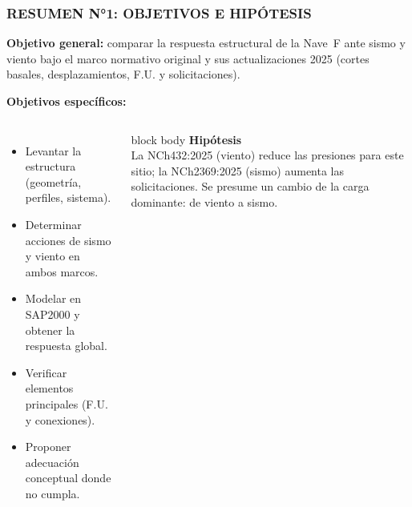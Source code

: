 \documentclass[11.5pt,aspectratio=169,handout]{beamer}
\newcommand{\ctitle}[1]{\frametitle{#1}}
\begin{document}
\begin{frame}
\ctitle{RESUMEN N°1: OBJETIVOS E HIPÓTESIS}
\vspace{-1mm}
{\footnotesize\textbf{Objetivo general:} comparar la respuesta estructural de la Nave~F ante sismo y viento
bajo el marco normativo original y sus actualizaciones 2025 (cortes basales,
desplazamientos, F.U. y solicitaciones).}

\vspace{2mm}
{\footnotesize\textbf{Objetivos específicos:}}\\[1mm]
\begin{columns}[T,totalwidth=\textwidth]
  \begin{itemize}\footnotesize\setlength{\itemsep}{1.5mm}
    \item \alert{Levantar} la estructura (geometría, perfiles,
          sistema).
    \item \alert{Determinar} acciones de sismo y viento en
          ambos marcos.
    \item \alert{Modelar} en SAP2000 y obtener la respuesta
          global.
    \item \alert{Verificar} elementos principales (F.U. y
          conexiones).
    \item \alert{Proponer} adecuación conceptual donde no
          cumpla.
  \end{itemize}
  \vspace{2mm}
  \begin{beamercolorbox}[rounded=true,shadow=true,sep=3mm]{block body}
  {\footnotesize\textbf{Hipótesis}}\\[1mm]
  {\footnotesize La \alert{NCh432:2025} (viento) \alert{reduce} las presiones
  para este sitio; la \alert{NCh2369:2025} (sismo)
  \alert{aumenta} las solicitaciones. Se presume un
  \alert{cambio de la carga dominante}: de viento a
  sismo.}
  \end{beamercolorbox}
\end{columns}
\end{frame}
\end{document}
